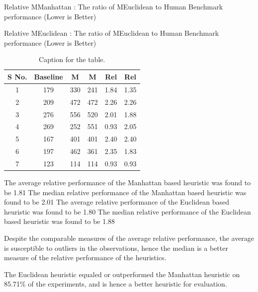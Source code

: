 Relative MManhattan : The ratio of MEuclidean to Human Benchmark performance (Lower is Better)
 
Relative MEuclidean : The ratio of MEuclidean to Human Benchmark performance (Lower is Better)

\begin{table}[h!]
  \centering
  \caption{Caption for the table.}
  \label{tab:table1}
  \begin{tabular}{cccccc}
    \toprule
      S No. & Baseline & M & M  & Rel & Rel\\
    \midrule
    	1 & 179 & 330 & 241 & 1.84 & 1.35\\
    	2 & 209 & 472 & 472 & 2.26 & 2.26\\
    	3 & 276 & 556 & 520 & 2.01 & 1.88\\
    	4 & 269 & 252 & 551 & 0.93 & 2.05\\
    	5 & 167 & 401 & 401 & 2.40 & 2.40\\
    	6 & 197 & 462 & 361 & 2.35 & 1.83\\
    	7 & 123 & 114 & 114 & 0.93 & 0.93\\
    \bottomrule
  \end{tabular}
\end{table}


The average relative performance of the Manhattan based heuristic was found to be 1.81
The median relative performance of the Manhattan based heuristic was found to be 2.01
The average relative performance of the Euclidean based heuristic was found to be 1.80
The median relative performance of the Euclidean based heuristic was found to be 1.88
 
Despite the comparable measures of the average relative performance, the average is susceptible to outliers in the observations, hence the median is a better measure of the relative performance of the heuristics.
  
The Euclidean heuristic equaled or outperformed the Manhattan heuristic on 85.71\% of the experiments, and is hence a better heuristic for evaluation.